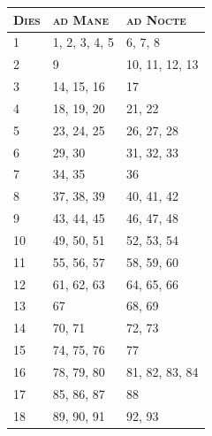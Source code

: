 {
  \newcommand{\cA}{\textbf{\textsc{Dies}}}
  \newcommand{\cB}{\textbf{\textsc{ad Mane}}}
  \newcommand{\cC}{\textbf{\textsc{ad Nocte}}}

  \begin{table}[h]
  \centering
  \footnotesize
  \begin{tabular}{|l|l|l|}
  \hline
  \cA  & \cB                          & \cC                          \\ \hline
  1    & 1, 2, 3, 4, 5                & 6, 7, 8                      \\ \hline
  2    & 9                            & 10, 11, 12, 13               \\ \hline
  3    & 14, 15, 16                   & 17                           \\ \hline
  4    & 18, 19, 20                   & 21, 22                       \\ \hline
  5    & 23, 24, 25                   & 26, 27, 28                   \\ \hline
  6    & 29, 30                       & 31, 32, 33                   \\ \hline
  7    & 34, 35                       & 36                           \\ \hline
  8    & 37, 38, 39                   & 40, 41, 42                   \\ \hline
  9    & 43, 44, 45                   & 46, 47, 48                   \\ \hline
  10   & 49, 50, 51                   & 52, 53, 54                   \\ \hline
  11   & 55, 56, 57                   & 58, 59, 60                   \\ \hline
  12   & 61, 62, 63                   & 64, 65, 66                   \\ \hline
  13   & 67                           & 68, 69                       \\ \hline
  14   & 70, 71                       & 72, 73                       \\ \hline
  15   & 74, 75, 76                   & 77                           \\ \hline
  16   & 78, 79, 80                   & 81, 82, 83, 84               \\ \hline
  17   & 85, 86, 87                   & 88                           \\ \hline
  18   & 89, 90, 91                   & 92, 93                       \\ \hline

\end{tabular}
\end{table}}
